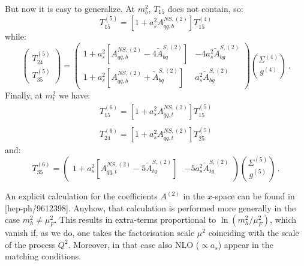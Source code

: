 \documentclass[10pt,a4paper]{article}
\begin{document}
But now it is easy to generalize. At $m_b^2$, $T_{15}$ does not
contain, so:
\begin{equation}\label{pippo2}
T_{15}^{(5)}=[1+a_s^2A_{qq,b}^{N\!S,(2)}]T_{15}^{(4)}
\end{equation}
while:
\begin{equation}\label{pippo3}
\begin{pmatrix} T_{24}^{(5)} \\ T_{35}^{(5)} \end{pmatrix} = \begin{pmatrix}  1+a_s^2[A_{qq,b}^{N\!S,(2)}-4\tilde{A}^{S,(2)}_{bq}] & -4a_s^2\tilde{A}^{S,(2)}_{bg}\\  
1+a_s^2[A_{qq,b}^{N\!S,(2)}+\tilde{A}^{S,(2)}_{bq}] & a_s^2\tilde{A}^{S,(2)}_{bg} \end{pmatrix}{\Sigma^{(4)} \choose g^{(4)}}\,.
\end{equation}
Finally, at $m_t^2$ we have:
\begin{equation}\label{pippo4}
\begin{array}{l}
\displaystyle T_{15}^{(6)}=[1+a_s^2A_{qq,t}^{N\!S,(2)}]T_{15}^{(5)}\\
\\
\displaystyle T_{24}^{(6)}=[1+a_s^2A_{qq,t}^{N\!S,(2)}]T_{25}^{(5)}
\end{array}
\end{equation}
and:
\begin{equation}\label{pippo5}
T_{35}^{(6)} = \begin{pmatrix}  1+a_s^2[A_{qq,t}^{N\!S,(2)}-5\tilde{A}^{S,(2)}_{tq}] & -5a_s^2\tilde{A}^{S,(2)}_{tg}\end{pmatrix}{\Sigma^{(5)} \choose g^{(5)}}\,.
\end{equation}

An explicit calculation for the coefficients $A^{(2)}$ in the
$x$-space can be found in [hep-ph/9612398]. Anyhow, that calculation
is performed more generally in the case $m_h^2\neq\mu_F^2$. This
results in extra-terms proportional to $\ln(m_h^2/\mu_F^2)$, which
vanish if, as we do, one takes the factorisation scale $\mu^2$
coinciding with the scale of the process $Q^2$. Moreover, in that case
also NLO ($\propto a_s$) appear in the matching conditions.
\end{document}
